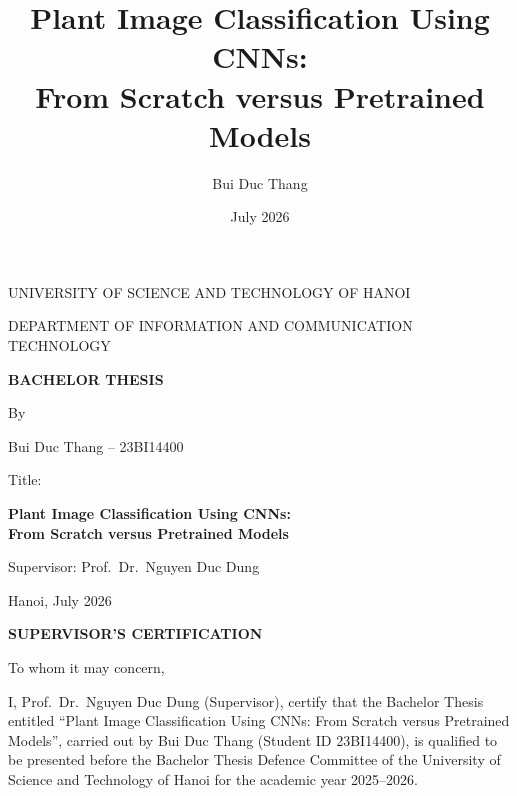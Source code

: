 \documentclass[12pt,a4paper]{article}
\title{Plant Image Classification Using CNNs:\\From Scratch versus Pretrained Models}
\author{Bui Duc Thang}
\date{July 2026}
\begin{document}
\begin{titlepage}
    \centering
    {\large UNIVERSITY OF SCIENCE AND TECHNOLOGY OF HANOI\par}
    \vspace{0.6cm}
    {\large DEPARTMENT OF INFORMATION AND COMMUNICATION TECHNOLOGY\par}
    \vspace{1.8cm}

    {\LARGE\bfseries BACHELOR THESIS\par}
    \vspace{1.6cm}

    {\large By\par}
    \vspace{0.4cm}
    {\large Bui Duc Thang -- 23BI14400\par}
    \vspace{1.4cm}

    {\large Title:\par}
    \vspace{0.5cm}
    {\LARGE\bfseries Plant Image Classification Using CNNs:\\[0.3em]
     From Scratch versus Pretrained Models\par}
    \vspace{2.2cm}

    {\large Supervisor: Prof.\ Dr.\ Nguyen Duc Dung\par}

    \vfill
    {\large Hanoi, July 2026\par}
\end{titlepage}

\clearpage
\thispagestyle{empty}
\begin{center}
    {\large\bfseries SUPERVISOR'S CERTIFICATION\par}
\end{center}
\vspace{1.2cm}

To whom it may concern,

\vspace{0.6cm}
I, Prof.\ Dr.\ Nguyen Duc Dung (Supervisor), certify that the Bachelor Thesis entitled ``Plant Image Classification Using CNNs: From Scratch versus Pretrained Models'', carried out by Bui Duc Thang (Student ID 23BI14400), is qualified to be presented before the Bachelor Thesis Defence Committee of the University of Science and Technology of Hanoi for the academic year 2025--2026.
\end{document}
